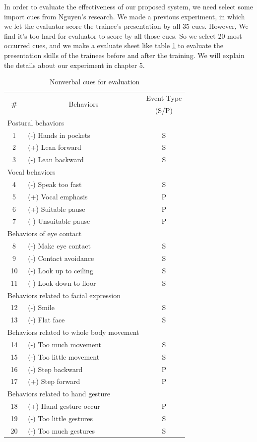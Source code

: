 \par In order to evaluate the effectiveness of our proposed system, we need select some import cues from Nguyen's research. We made a previous experiment, in which we let the evaluator score the trainee's presentation by all 35 cues. However, We find it's too hard for evaluator to score by all those cues. So we select 20 most occurred cues, and we make a evaluate sheet like table \ref{tab:evalutioncues} to evaluate the presentation skills of the trainees before and after the training. We will explain the details about our experiment in chapter 5.

\begin{table}[]
\centering
\caption{Nonverbal cues for evaluation}
\label{tab:evalutioncues}
\begin{tabular}{clc}
\hline
\multirow{3}{*}{\textbf{\#}} & \multicolumn{1}{c}{\multirow{3}{*}{Behaviors}} & \multirow{2}{*}{Event Type} \\
 & \multicolumn{1}{c}{} &  \\
 & \multicolumn{1}{c}{} & (S/P) \\ \hline
\multicolumn{2}{l}{Postural behaviors} &  \\
1 & (-) Hands in pockets & S \\
2 & (+) Lean forward & S \\
3 & (-) Lean backward & S \\ \hline
\multicolumn{2}{l}{Vocal behaviors} &  \\
4 & (-) Speak too fast & S \\
5 & (+) Vocal emphasis & P \\
6 & (+) Suitable pause & P \\
7 & (-) Unsuitable pause & P \\ \hline
\multicolumn{2}{l}{Behaviors of eye contact} &  \\
8 & (-) Make eye contact & S \\
9 & (-) Contact avoidance & S \\
10 & (-) Look up to ceiling & S \\
11 & (-) Look down to floor & S \\ \hline
\multicolumn{2}{l}{Behaviors related to facial expression} &  \\
12 & (-) Smile & S \\
13 & (-) Flat face & S \\ \hline
\multicolumn{2}{l}{Behaviors related to whole body movement} &  \\
14 & (-) Too much movement & S \\
15 & (-) Too little movement & S \\
16 & (-) Step backward & P \\
17 & (+) Step forward & P \\ \hline
\multicolumn{3}{l}{Behaviors related to hand gesture} \\
18 & (+) Hand gesture occur & P \\
19 & (-) Too little gestures & S \\
20 & (-) Too much gestures & S \\ \hline
\end{tabular}
\end{table}
